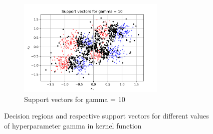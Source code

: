 \documentclass[a4paper]{article}    %
\begin{document}
\begin{figure}[H]
\begin{subfigure}{0.45\textwidth}
        \centering
        \includegraphics[width=7cm]{support_vectors_gamma_10}
        \caption{Support vectors for gamma = 10}
        \label{fig:svm-support_vectors_gamma_10}
    \end{subfigure}
    \caption{Decision regions and respective support vectors for different values of hyperparameter gamma in kernel function}
    \label{fig:svm-decision_regions_support_vectos_gamma}
\end{figure}


\end{document}
